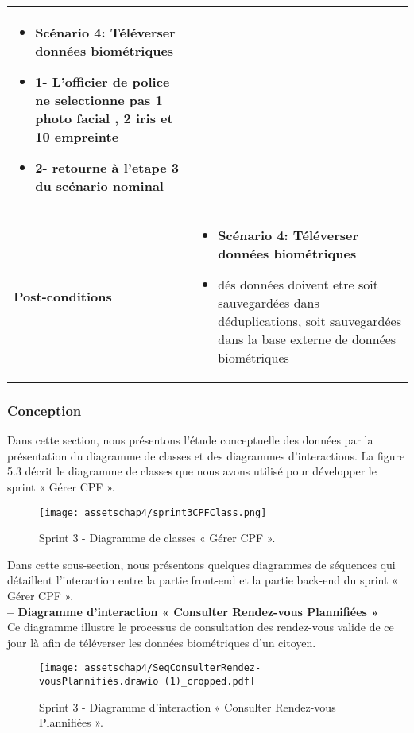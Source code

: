\begin{longtable}{|>{\arraybackslash}p{4.2cm}|>{\arraybackslash}p{12.5cm}|}
\begin{itemize}[label=]
  \item\textbf{Scénario 4: Téléverser données biométriques}
  \item 1- L'officier de police ne selectionne pas 1 photo facial , 2 iris et 10 empreinte
  \item 2- retourne à l'etape 3 du scénario nominal

\end{itemize} \\



\hline
\textbf{Post-conditions } &
\begin{itemize}[label=]
  \item\textbf{Scénario 4: Téléverser données biométriques}
  \item dés données doivent etre soit sauvegardées dans déduplications, soit sauvegardées dans la base externe de données biométriques
\end{itemize}
\end{longtable}




\subsubsection{Conception}
Dans cette section, nous présentons l'étude conceptuelle des données par la présentation du
diagramme de classes et des diagrammes d'interactions.
La figure 5.3 décrit le diagramme de classes que nous avons utilisé pour développer le sprint « Gérer CPF ».

\begin{figure}[H]
\centering
\texttt{[image: assetschap4/sprint3CPFClass.png]}
\caption{ Sprint 3 - Diagramme de classes « Gérer CPF ». }
\end{figure}

Dans cette sous-section, nous présentons quelques diagrammes de séquences qui détaillent
l'interaction entre la partie front-end et la partie back-end du sprint « Gérer CPF ».\\




\textbf{– Diagramme d'interaction « Consulter Rendez-vous Plannifiées »}\\
Ce diagramme illustre le processus de consultation des rendez-vous valide de ce jour là afin de téléverser les données biométriques d'un citoyen.
\begin{figure}[H]
\centering
\texttt{[image: assetschap4/SeqConsulterRendez-vousPlannifiés.drawio (1)\_cropped.pdf]}
\caption{ Sprint 3 - Diagramme d'interaction « Consulter Rendez-vous Plannifiées ». }
\end{figure}



